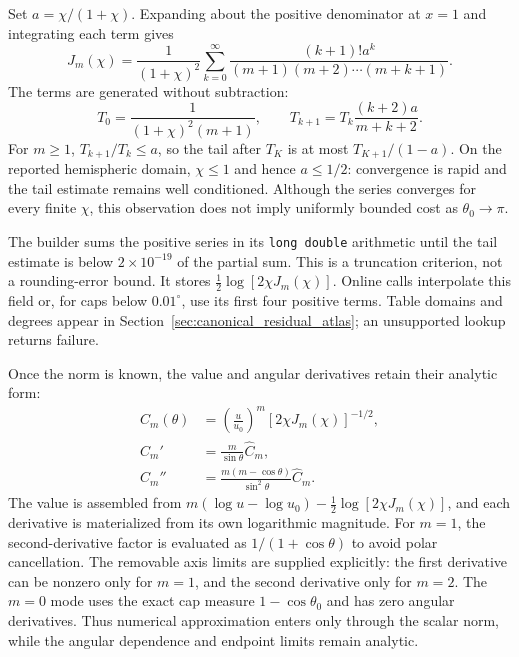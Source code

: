 ﻿\documentclass[11pt,a4paper]{article}
\begin{document}
Set $a=\chi/(1+\chi)$. Expanding about the positive denominator at $x=1$ and integrating each term gives
\begin{equation}
 J_m(\chi)=\frac{1}{(1+\chi)^2}
 \sum_{k=0}^{\infty}
 \frac{(k+1)!a^k}{(m+1)(m+2)\cdots(m+k+1)}.
 \label{eq:constant_series}
\end{equation}
The terms are generated without subtraction:
\begin{equation}
 T_0=\frac{1}{(1+\chi)^2(m+1)},
 \qquad T_{k+1}=T_k\frac{(k+2)a}{m+k+2}.
\end{equation}
For $m\geq1$, $T_{k+1}/T_k\leq a$, so the tail after $T_K$ is at most $T_{K+1}/(1-a)$. On the reported hemispheric domain, $\chi\leq1$ and hence $a\leq1/2$: convergence is rapid and the tail estimate remains well conditioned. Although the series converges for every finite $\chi$, this observation does not imply uniformly bounded cost as $\theta_0\to\pi$.

The builder sums the positive series in its \texttt{long double} arithmetic until the tail estimate is below $2\times10^{-19}$ of the partial sum. This is a truncation criterion, not a rounding-error bound. It stores $\tfrac12\log[2\chi J_m(\chi)]$. Online calls interpolate this field or, for caps below $0.01^\circ$, use its first four positive terms. Table domains and degrees appear in Section~\ref{sec:canonical_residual_atlas}; an unsupported lookup returns failure.

Once the norm is known, the value and angular derivatives retain their analytic form:
\begin{align}
 \widehat C_m(\theta)&=\left(\frac{u}{u_0}\right)^m
 [2\chi J_m(\chi)]^{-1/2},\\
 \widehat C_m'&=\frac{m}{\sin\theta}\widehat C_m,\\
 \widehat C_m''&=\frac{m(m-\cos\theta)}{\sin^2\theta}\widehat C_m.
 \label{eq:constant_derivatives}
\end{align}
The value is assembled from $m(\log u-\log u_0)-\tfrac12\log[2\chi J_m(\chi)]$, and each derivative is materialized from its own logarithmic magnitude. For $m=1$, the second-derivative factor is evaluated as $1/(1+\cos\theta)$ to avoid polar cancellation. The removable axis limits are supplied explicitly: the first derivative can be nonzero only for $m=1$, and the second derivative only for $m=2$. The $m=0$ mode uses the exact cap measure $1-\cos\theta_0$ and has zero angular derivatives. Thus numerical approximation enters only through the scalar norm, while the angular dependence and endpoint limits remain analytic.
\end{document}
